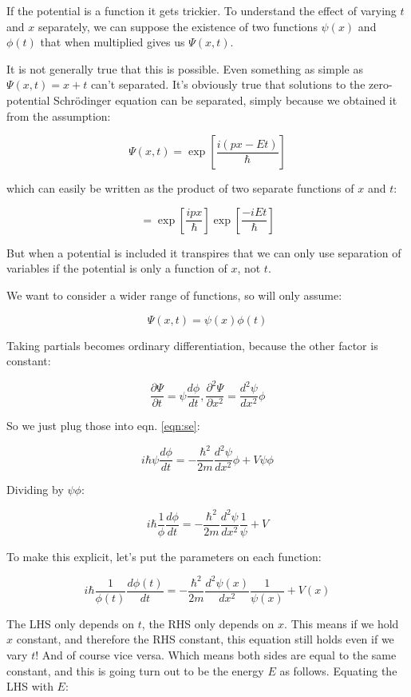 If the potential is a function it gets trickier. To understand the effect of varying $t$ and $x$ separately, we can suppose the existence of two functions $\psi(x)$ and $\phi(t)$ that when multiplied gives us $\Psi(x, t)$.

It is not generally true that this is possible. Even something as simple as $\Psi(x, t) = x + t$ can't separated. It's obviously true that solutions to the zero-potential Schrödinger equation can be separated, simply because we obtained it from the assumption:

$$
\Psi(x, t) = \exp \left[ {\frac{i(px - Et)}{\hbar}} \right]
$$

which can easily be written as the product of two separate functions of $x$ and $t$:

$$
= \exp \left[ {\frac{ipx}{\hbar}} \right]
\exp \left[ {\frac{-iEt}{\hbar}} \right]
$$

But when a potential is included it transpires that we can only use separation of variables if the potential is only a function of $x$, not $t$.

We want to consider a wider range of functions, so will only assume:

$$\Psi(x, t) = \psi(x) \phi(t)$$

Taking partials becomes ordinary differentiation, because the other factor is constant:

$$
\frac{\partial \Psi}{\partial t}
= \psi \frac{d \phi}{d t},
\frac{\partial^2 \Psi}{\partial x^2}
= \frac{d^2 \psi}{d x^2}  \phi
$$

So we just plug those into eqn. \ref{eqn:se}:

$$
i\hbar
\psi \frac{d \phi}{d t}
=
- \frac{\hbar^2}{2m}
\frac{d^2 \psi}{d x^2}  \phi
+ V \psi \phi
$$

Dividing by $\psi \phi$:

$$
i\hbar
\frac{1}{\phi}
\frac{d \phi}{d t}
=
- \frac{\hbar^2}{2m}
\frac{d^2 \psi}{d x^2}
\frac{1}{\psi}
+ V
$$

To make this explicit, let's put the parameters on each function:

$$
i\hbar
\frac{1}{\phi(t)}
\frac{d \phi(t)}{d t}
=
- \frac{\hbar^2}{2m}
\frac{d^2 \psi(x)}{d x^2}
\frac{1}{\psi(x)}
+ V(x)
$$

The LHS only depends on $t$, the RHS only depends on $x$. This means if we hold $x$ constant, and therefore the RHS constant, this equation still holds even if we vary $t$! And of course vice versa. Which means both sides are equal to the same constant, and this is going turn out to be the energy $E$ as follows. Equating the LHS with $E$:

